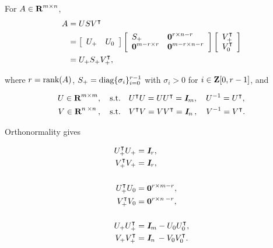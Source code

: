 \documentclass{article}
\begin{document}
    For $A\in\textbf{R}^{m\times n}$,
    \begin{align*}
        A   &=U S V^\intercal\\
            &=\left[
            \begin{array}{ll}
                U_+ & U_0
            \end{array}    
            \right]
            \left[
                \begin{array}{ll}
                    S_+ & \textbf{0}^{r\times n-r}\\
                    \textbf{0}^{m-r\times r} & \textbf{0}^{m-r\times n-r}
                \end{array}    
                \right]
            \left[
            \begin{array}{l}
                V_+^\intercal \\
                V_0^\intercal
            \end{array}    
            \right]\\
            &= U_+ S_+ V_+^\intercal,
    \end{align*}

    where $r = \text{rank}(A)$, $S_+=\text{diag}\{\sigma_i\}_{i=0}^{r-1}$ 
    with $\sigma_i>0$ for $i\in\textbf{Z}[0,r-1]$, and

    \begin{align*}
        U\in\textbf{R}^{m\times m},\quad\text{s.t.}\quad &U^\intercal U = UU^\intercal = \emph{\textbf{I}}_m,\quad U^{-1}=U^\intercal,\\
        V\in\textbf{R}^{n\:\times n\:},\quad\text{s.t.}\quad &V^\intercal V = VV^\intercal = \emph{\textbf{I}}_{n\:},\quad V^{-1}=V^\intercal.
    \end{align*}

    Orthonormality gives

    \begin{align*}
        U_+^\intercal U_+  &= \emph{\textbf{I}}_r, \\
        V_+^\intercal V_+  &= \emph{\textbf{I}}_r, \\\\
        U_+^\intercal U_0  &= \textbf{0}^{r \times m-r}, \\
        V_+^\intercal V_0  &= \textbf{0}^{r \times {n\:}-r},\\\\
        U_+ U_+^\intercal &= \emph{\textbf{I}} _m - U_0U_0^\intercal, \\
        V_+ V_+^\intercal &= \emph{\textbf{I}} _{n\:} - V_0V_0^\intercal.
    \end{align*}
    
\end{document}
